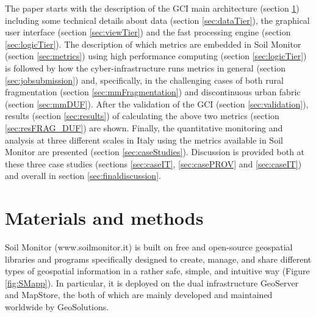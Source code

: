 \documentclass[APA,LATO1COL,doublespace]{WileyNJD-v2}
\begin{document}
The paper starts with the description of the GCI main architecture (section \ref{sec:MatMet}) including some technical details about data (section \ref{sec:dataTier}), the graphical user interface (section \ref{sec:viewTier}) and the fast processing engine (section \ref{sec:logicTier}). 
The description of which metrics are embedded in Soil Monitor (section \ref{sec:metrics}) using high performance computing (section \ref{sec:logicTier}) is followed by how the cyber-infrastructure runs metrics in general (section \ref{sec:jobsubmission}) and, specifically, in the challenging cases of both rural fragmentation (section \ref{sec:mmFragmentation}) and discontinuous urban fabric (section \ref{sec:mmDUF}).
After the validation of the GCI (section \ref{sec:validation}), results (section \ref{sec:results}) of calculating the above two metrics (section \ref{sec:resFRAG_DUF}) are shown.
Finally, the quantitative monitoring and analysis at three different scales in Italy using the metrics available in Soil Monitor are presented (section \ref{sec:caseStudies}).
Discussion is provided both at these three case studies (sections \ref{sec:caseIT}, \ref{sec:casePROV} and \ref{sec:caseIT}) and overall in section \ref{sec:finaldiscussion}.

\section{Materials and methods}
\label{sec:MatMet}
Soil Monitor (www.soilmonitor.it) is built on free and open-source geospatial libraries and programs specifically designed to create, manage, and share different types of geospatial information in a rather safe, simple, and intuitive way (Figure \ref{fig:SMapp}).
In particular, it is deployed on the dual infrastructure GeoServer and MapStore, the both of which are mainly developed and maintained worldwide by GeoSolutions.
\end{document}
